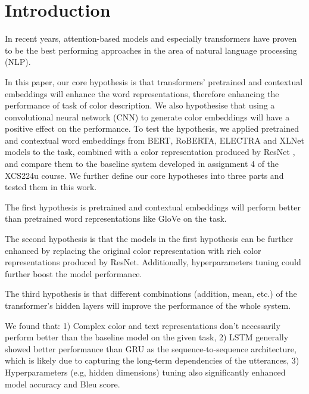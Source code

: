 \section{Introduction}

In recent years, attention-based models and especially transformers have proven to be the best performing approaches in the area of natural language processing (NLP).

\par
In this paper, our core hypothesis is that transformers’ pretrained and contextual embeddings will enhance the word representations, therefore enhancing the performance of task of color description. We also hypothesise that using a convolutional neural network (CNN) to generate color embeddings will have a positive effect on the performance.  To test the hypothesis,  we applied pretrained and contextual word embeddings from BERT, RoBERTA, ELECTRA and XLNet models to the task, combined with a color representation produced by ResNet , and compare them to the baseline system developed in assignment 4 of the XCS224u course. We further define our core hypotheses into three parts and tested them in this work.

\par
The first hypothesis is pretrained and contextual embeddings will perform better than pretrained word representations like GloVe on the task.

\par
The second hypothesis is that the models in the first hypothesis can be further enhanced by replacing the original color representation with rich color representations produced by ResNet. Additionally, hyperparameters tuning could further  boost the model performance.

\par
The third hypothesis is that different combinations (addition, mean, etc.) of the transformer’s hidden layers will improve the performance of the whole system.

\par
We found that: 1) Complex color and text representations don’t necessarily perform better than the baseline model on the given task, 2) LSTM generally showed better performance than GRU as the sequence-to-sequence architecture, which is likely due to capturing the long-term dependencies of the utterances, 3) Hyperparameters (e.g, hidden dimensions) tuning also significantly enhanced model accuracy and Bleu score.

